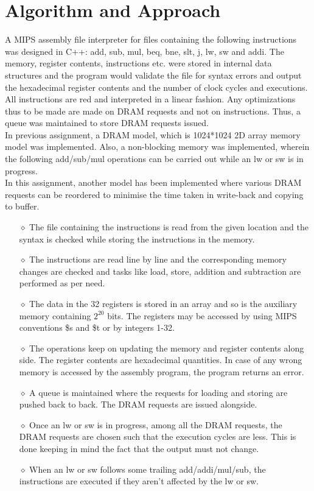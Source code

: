 \documentclass{article} %
\begin{document}
\section{Algorithm and Approach}
A MIPS assembly file interpreter for files containing the following instructions was designed in C++: add, sub, mul, beq, bne, slt, j, lw, sw and addi. The memory, register contents, instructions etc. were stored in internal data structures and the program would validate the file for syntax errors and output the hexadecimal register contents and the number of clock cycles and executions. All instructions are red and interpreted in a linear fashion. Any optimizations thus to be made are made on DRAM requests and not on instructions. Thus, a queue was maintained to store DRAM requests issued.
\\In previous assignment, a DRAM model, which is 1024*1024 2D array memory model was implemented. Also, a non-blocking memory was implemented, wherein the following add/sub/mul operations can be carried out while an lw or sw is in progress.
\\In this assignment, another model has been implemented where various DRAM requests can be reordered to minimise the time taken in write-back and copying to buffer.
\begin{itemize}
    \item[$\diamond$] The file containing the instructions is read from the given location and the syntax is checked while storing the instructions in the memory.
    \item[$\diamond$] The instructions are read line by line and the corresponding memory changes are checked and tasks like load, store, addition and subtraction are performed as per need.
    \item[$\diamond$] The data in the 32 registers is stored in an array and so is the auxiliary memory containing $2^{20}$ bits. The registers may be accessed by using MIPS conventions \$s and \$t or by integers 1-32.
    \item[$\diamond$] The operations keep on updating the memory and register contents along side. The register contents are hexadecimal quantities. In case of any wrong memory is accessed by the assembly program, the program returns an error.
    \item[$\diamond$] A queue is maintained where the requests for loading and storing are pushed back to back. The DRAM requests are issued alongside.
    \item[$\diamond$] Once an lw or sw is in progress, among all the DRAM requests, the DRAM requests are chosen such that the execution cycles are less. This is done keeping in mind the fact that the output must not change.
    \item[$\diamond$] When an lw or sw follows some trailing add/addi/mul/sub, the instructions are executed if they aren't affected by the lw or sw.
\end{itemize}
\end{document}
